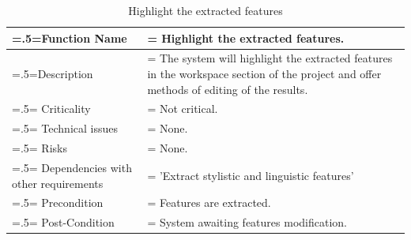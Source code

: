 \documentclass[12pt]{article}
\begin{document}
\begin{center}
    \begin{table}[H]
        \caption{Highlight the extracted features}
        \begin{tabularx}{\textwidth} {
                | >{\raggedright\arraybackslash\hsize=.5\hsize\linewidth=\hsize}X
                | >{\raggedright\arraybackslash\hsize=1.5\hsize\linewidth=\hsize}X |}
            \hline
            Function Name                        & Highlight the extracted features.                                                                                                     \\ \hline
            Description                          & The system will highlight the extracted features in the workspace section of the project and offer methods of editing of the results. \\ \hline
            Criticality                          & Not critical.                                                                                                                         \\ \hline
            Technical issues                     & None.                                                                                                                                 \\ \hline
            Risks                                & None.                                                                                                                                 \\ \hline
            Dependencies with other requirements & 'Extract stylistic and linguistic features'                                                                                           \\ \hline
            Precondition                         & Features are extracted.                                                                                                               \\ \hline
            Post-Condition                       & System awaiting features modification.                                                                                                \\ \hline
        \end{tabularx}
    \end{table}
\end{center}
\end{document}

